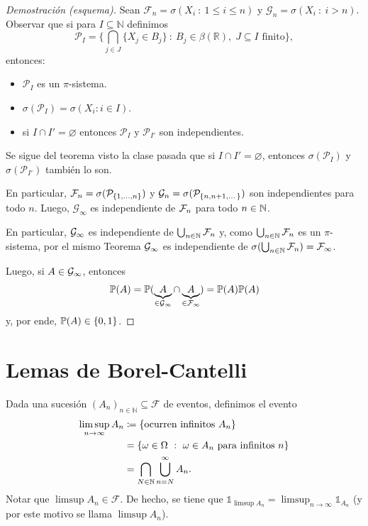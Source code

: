 \begin{proof}[Demostración (esquema)]
    Sean \(\mathcal{F}_n = \sigma(X_{i} \ : \ 1 \leq i \leq n)\) y \(\mathcal{G}_n = \sigma(X_{i} \ : \ i > n)\). Observar que si para \(I \subseteq \mathbb{N}\) definimos
    \[
    \mathcal{P}_I = \Big\{ \bigcap_{j \in J} \{X_j \in B_j\} \ : \ B_j \in \beta(\mathbb{R}),\; J \subseteq I \text{ finito} \Big\},
    \]
    entonces:
    \begin{itemize}
        \item \(\mathcal{P}_I\) es un \(\pi\)-sistema.

        \item \(\sigma(\mathcal{P}_I) = \sigma(X_i : i \in I)\).

        \item si \(I \cap I' = \varnothing\) entonces \(\mathcal{P}_I\) y \(\mathcal{P}_{I'}\) son independientes.
	\end{itemize}
	Se sigue del teorema visto la clase pasada que si \(I \cap I' = \varnothing\), entonces \(\sigma(\mathcal{P}_I)\) y \(\sigma(\mathcal{P}_{I'})\) también lo son. \par
	En particular, \(\mathcal{F}_n = \sigma(\mathcal{P}_{\{1,\dots,n\}})\) y \(\mathcal{G}_n = \sigma(\mathcal{P}_{\{n, n+1, \dots\}})\) son independientes para todo \(n\). Luego, \(\mathcal{G}_{\infty}\) es independiente de $\mathcal{F}_{n}$ para todo $n \in \mathbb{N}$. \par
	En particular, $\mathcal{G}_{\infty}$ es independiente de $\bigcup_{n \in \mathbb{N}} \mathcal{F}_{n}$ y, como $\bigcup_{n \in \mathbb{N}} \mathcal{F}_{n}$ es un $\pi$-sistema, por el mismo Teorema $\mathcal{G}_{\infty}$ es independiente de $\sigma(\bigcup_{n \in \mathbb{N}} \mathcal{F}_{n}) = \mathcal{F}_{\infty}$. \par
	Luego, si $A \in \mathcal{G}_{\infty}$, entonces 
	\[ \mathbb{P}(A) = \mathbb{P}(\underbrace{A}_{\in \mathcal{G}_{\infty}} \cap \underbrace{A}_{\in \mathcal{F}_{\infty}}) = \mathbb{P}(A) \mathbb{P}(A) \]
	y, por ende, $\mathbb{P}(A) \in \{0,1\}$.
\end{proof}

\section{Lemas de Borel-Cantelli}

\begin{definition}
    Dada una sucesión \((A_n)_{n\in\mathbb{N}} \subseteq \mathcal{F}\) de eventos, definimos el evento
	\begin{align*}
		\limsup_{n\to\infty} A_n &\coloneq \{\text{ocurren infinitos } A_n\} \\
		&= \{\omega \in \Omega \ : \ \omega \in A_{n} \text{ para infinitos } n\} \\
		&= \bigcap_{N \in \mathbb{N}} \bigcup_{n = N}^{\infty} A_{n}.
	\end{align*}
    Notar que \(\limsup A_n \in \mathcal{F}\). De hecho, se tiene que \(\mathds{1}_{\limsup A_n} = \limsup_{n\to\infty} \mathds{1}_{A_n}\) (y por este motivo se llama \(\limsup A_{n}\)).
\end{definition}

